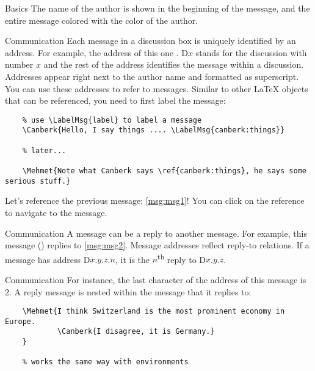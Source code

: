 \documentclass{article}
\begin{document}
\begin{discussionbox}
\begin{dboxmsg}{Basics}
    \noindent The name of the author is shown in the beginning of the message, and the entire message colored with the color of the author.
    \end{dboxmsg}

    \begin{dboxmsg}{Communication}
        Each message in a discussion box is uniquely identified by an address.
        For example, the address of this one .
        D$x$ stands for the discussion with number $x$ and the rest of the address identifies the message within a discussion.
        Addresses appear right next to the author name and formatted as superscript.
        You can use these addresses to refer to messages.
        Similar to other \LaTeX{} objects that can be referenced, you need to first label the message:

        \begin{verbatim}
    % use \LabelMsg{label} to label a message
    \Canberk{Hello, I say things .... \LabelMsg{canberk:things}}

    % later...

    \Mehmet{Note what Canberk says \ref{canberk:things}, he says some serious stuff.}
        \end{verbatim}
        
        \noindent Let's reference the previous message: \ref{msg:msg1}!
        You can click on the reference to navigate to the message.

        \begin{dboxmsg}{Communication}
            A message can be a reply to another message.
            For example, this message () replies to \ref{msg:msg2}.
            Message addresses reflect reply-to relations.
            If a message has address D$x$.$y$.$z$.$n$, it is the $n$\textsuperscript{th} reply to D$x$.$y$.$z$.
        \end{dboxmsg}
        \begin{dboxmsg}{Communication}
            For instance, the last character of the address of this message is 2.
            A reply message is nested within the message that it replies to:
            \begin{verbatim}
    \Mehmet{I think Switzerland is the most prominent economy in Europe.
            \Canberk{I disagree, it is Germany.}
    }

    % works the same way with environments
            \end{verbatim}
        \end{dboxmsg}
    \end{dboxmsg}
\end{discussionbox}
\end{document}
